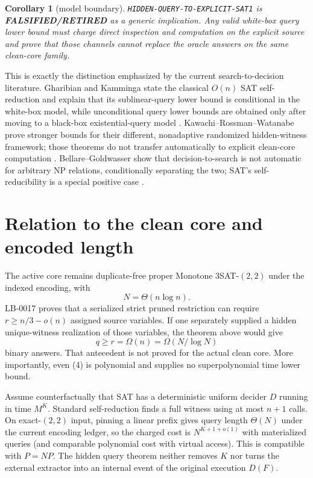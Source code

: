 \documentclass[11pt]{article}
\newtheorem{corollary}{Corollary}
\newcommand{\RETIRED}{\textbf{FALSIFIED/RETIRED}}
\begin{document}
\begin{corollary}[model boundary]
\texttt{HIDDEN-QUERY-TO-EXPLICIT-SAT1} is \RETIRED{} as a generic implication.  Any valid white-box query lower bound must charge direct inspection and computation on the explicit source and prove that those channels cannot replace the oracle answers on the same clean-core family.
\end{corollary}

This is exactly the distinction emphasized by the current search-to-decision literature.  Gharibian and Kamminga state the classical $O(n)$ SAT self-reduction and explain that its sublinear-query lower bound is conditional in the white-box model, while unconditional query lower bounds are obtained only after moving to a black-box existential-query model \cite{gk}.  Kawachi--Rossman--Watanabe prove stronger bounds for their different, nonadaptive randomized hidden-witness framework; those theorems do not transfer automatically to explicit clean-core computation \cite{krw}.  Bellare--Goldwasser show that decision-to-search is not automatic for arbitrary NP relations, conditionally separating the two; SAT's self-reducibility is a special positive case \cite{bg}.

\section{Relation to the clean core and encoded length}

The active core remains duplicate-free proper Monotone $3$SAT-$(2,2)$ under the indexed encoding, with
\[
 N=\Theta(n\log n).
\]
LB-0017 proves that a serialized strict pruned restriction can require $r\ge n/3-o(n)$ assigned source variables.  If one separately supplied a hidden unique-witness realization of those variables, the theorem above would give
\[
 q\ge r=\Omega(n)=\Omega(N/\log N)
 \tag{4}
\]
binary answers.  That antecedent is not proved for the actual clean core.  More importantly, even (4) is polynomial and supplies no superpolynomial time lower bound.

Assume counterfactually that SAT has a deterministic uniform decider $D$ running in time $M^K$.  Standard self-reduction finds a full witness using at most $n+1$ calls.  On exact-$(2,2)$ input, pinning a linear prefix gives query length $\Theta(N)$ under the current encoding ledger, so the charged cost is $N^{K+1+o(1)}$ with materialized queries (and comparable polynomial cost with virtual access).  This is compatible with $P=NP$.  The hidden query theorem neither removes $K$ nor turns the external extractor into an internal event of the original execution $D(F)$.
\end{document}
